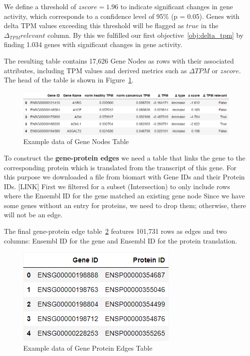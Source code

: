 We define a threshold of  $z score = 1.96$ to indicate significant changes in gene activity,
which corresponds to a confidence level of 95\% (p = 0.05).
Genes with delta TPM values exceeding this threshold will be flagged as $true$ in the $\Delta_{TPM} relevant$ column.
By this we fulfilled our first objective~\ref{obj:delta_tpm} by finding 1.034 genes with significant changes in gene activity.

The resulting table contains 17,626 Gene Nodes as rows with their associated attributes,
including TPM values and derived metrics such as $\Delta TPM$ or $z score$.
The head of the table is shown in Figure~\ref{fig:03_02_df_gene_nodes}.

\begin{figure}[h]
    \centering
    \includegraphics[height=\dfheight]{figures/03_02_gene_nodes}
    \caption{Example data of Gene Nodes Table}
    \label{fig:03_02_df_gene_nodes}
\end{figure}

To construct the \textbf{gene-protein edges} we need a table that links the gene to the corresponding protein
which is translated from the transcript of this gene.
For this purpose we downloaded a file from biomart with Gene IDs and their Protein IDs. [LINK]
First we filtered for a subset (Intersection) to only include rows where the Ensembl ID for the gene matched an existing gene node
Since we have some genes without an entry for proteins, we need to drop them; otherwise, there will not be an edge.

The final gene-protein edge table~\ref{fig:03_02_df_gene_protein_edges} features 101,731 rows as edges and two columns:
Ensembl ID for the gene and Ensembl ID for the protein translation.

\begin{figure}[h]
    \centering
    \includegraphics[height=\dfheight]{figures/03_02_gene_protein_edges}
    \caption{Example data of Gene Protein Edges Table}
    \label{fig:03_02_df_gene_protein_edges}
\end{figure}


